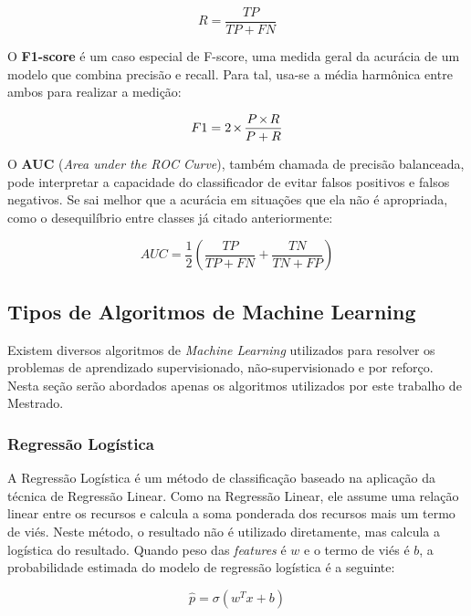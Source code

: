 \documentclass[portugues]{ic-tese}
\let\oldtimes\times
\def\times{{\mkern1mu\oldtimes\mkern1mu}}
\begin{document}
\begin{equation}
R = \frac{TP}{TP + FN}
\end{equation}

O \textbf{F1-score} é um caso especial de F-score, uma medida geral da acurácia de um modelo que combina precisão e recall. Para tal, usa-se a média harmônica entre ambos para realizar a medição:

\begin{equation}
F1 = 2 \times\frac{P \times R}{P + R}
\end{equation}

O \textbf{AUC} (\textit{Area under the ROC Curve}), também chamada de precisão balanceada, pode interpretar a capacidade do classificador de evitar falsos positivos e falsos negativos. Se sai melhor que a acurácia em situações que ela não é apropriada, como o desequilíbrio entre classes já citado anteriormente:

\begin{equation}
AUC = \frac{1}{2} \left( \frac{TP}{TP + FN} + \frac{TN}{TN + FP} \right)
\end{equation}

\subsection{Tipos de Algoritmos de Machine Learning}
\label{sec:MLAlgorithms}

Existem diversos algoritmos de \textit{Machine Learning} utilizados para resolver os problemas de aprendizado supervisionado, não-supervisionado e por reforço. Nesta seção serão abordados apenas os algoritmos utilizados por este trabalho de Mestrado.

\subsubsection{Regressão Logística}

A Regressão Logística é um método de classificação baseado na aplicação da técnica de Regressão Linear. Como na Regressão Linear, ele assume uma relação linear entre os recursos e calcula a soma ponderada dos recursos mais um termo de viés. Neste método, o resultado não é utilizado diretamente, mas calcula a logística do resultado. Quando peso das \textit{features} é $w$ e o termo de viés é $b$, a probabilidade estimada do modelo de regressão logística é a seguinte:

\begin{equation}
\hat{p} = \sigma (w^{T}x + b)
\end{equation}
\end{document}

